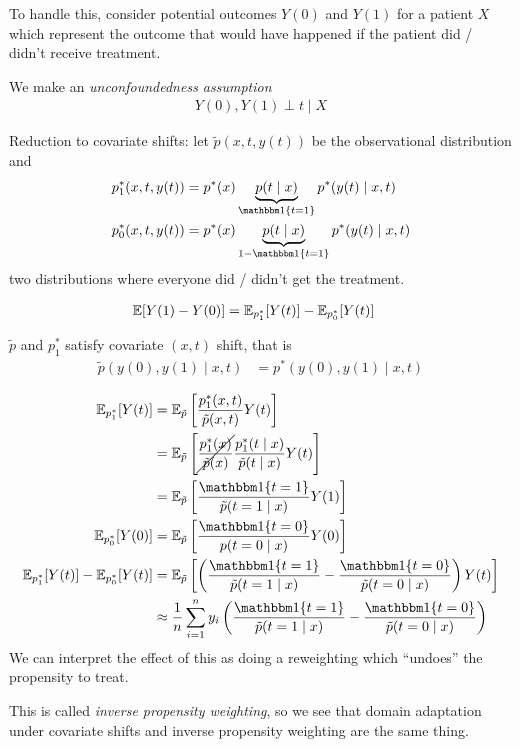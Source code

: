 To handle this, consider potential outcomes $Y(0)$ and $Y(1)$
for a patient $X$ which represent the outcome that would have
happened if the patient did / didn't receive treatment.

We make an \emph{unconfoundedness assumption}
\begin{align}
  Y(0), Y(1) \perp t \mid X
\end{align}

Reduction to covariate shifts:
let $\tilde{p}(x, t, y(t))$ be the observational distribution
and
\begin{align}
  p_1^*(x,t,y(t))
  &= p^*(x) \underbrace{p(t \mid x)}_{\ind\{t=1\}} p^*(y(t) \mid x, t) \\
  p_0^*(x,t,y(t))
  &= p^*(x) \underbrace{p(t \mid x)}_{1-\ind\{t=1\}} p^*(y(t) \mid x, t)
\end{align}
two distributions where everyone did / didn't get the treatment.

\begin{proposition}
  \begin{align}
    \mathbb{E}[Y(1) - Y(0)]
    &= \mathbb{E}_{p_1^*}[Y(t)] - \mathbb{E}_{p_0^*}[Y(t)]
  \end{align}
\end{proposition}

\begin{proposition}
  $\tilde{p}$ and $p_1^*$ satisfy covariate $(x,t)$ shift, that is
  \begin{align}
    \tilde{p}(y(0), y(1) \mid x, t)
    &= p^*(y(0), y(1) \mid x, t)
  \end{align}
\end{proposition}

\begin{align}
  \ex_{p_1^*}[Y(t)]
  &= \ex_{\tilde{p}}\left[
    \frac{p_1^*(x,t)}{\tilde{p}(x,t)} Y(t)
  \right] \\
  &= \ex_{\tilde{p}}\left[
    \cancel{\frac{p_1^*(x)}{\tilde{p}(x)}} \frac{p^*_1(t \mid x)}{\tilde{p}(t\mid x)} Y(t)
  \right] \\
  &= \ex_{\tilde{p}}\left[
      \frac{\ind\{t=1\}}{\tilde{p}(t=1 \mid x)} Y(1)
    \right] \\
  \ex_{p_0^*}[ Y(0) ]
  &= \ex_{\tilde{p}}\left[
    \frac{\ind\{t=0\}}{p(t=0 \mid x)} Y(0)
  \right] \\
  \ex_{p_1^*}[Y(t)] - \ex_{p_0^*}[ Y(t) ]
  &= \ex_{\tilde{p}}\left[
    \left( \frac{\ind\{t=1\}}{\tilde{p}(t=1 \mid x)} - \frac{\ind\{t=0\}}{\tilde{p}(t=0 \mid x)} \right)
    Y(t)
  \right] \\
  &\approx \frac{1}{n}  \sum_{i=1}^n y_i \left(
  \frac{\ind\{t=1\}}{\tilde{p}(t=1 \mid x)}
  - \frac{\ind\{t=0\}}{\tilde{p}(t=0 \mid x)}
\right)
\end{align}
We can interpret the effect of this as doing a reweighting which ``undoes''
the propensity to treat.

This is called \emph{inverse propensity weighting}, so we see that
domain adaptation under covariate shifts and inverse propensity weighting
are the same thing.
